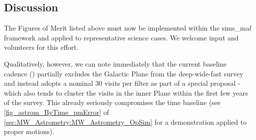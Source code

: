 \subsection{Discussion}
\label{sec:\secname:MW_Disk_discussion}

The Figures of Merit listed above must now be implemented within the
sims\_maf framework and applied to representative science cases.
 We welcome input and volunteers for
this effort.

Qualitatively, however, we can note immediately that the current
baseline cadence () partially excludes the
Galactic Plane from the deep-wide-fast survey and instead adopts a
nominal 30 visits per filter as part of a special proposal - which
also tends to cluster the visits in the inner Plane within the first
few years of the survey. This already seriously compromises the time
baseline (see \autoref{fig_astrom_ByTime_pmError} of
\autoref{sec:MW_Astrometry:MW_Astrometry_OpSim} for a demonstration applied to
proper motions).



